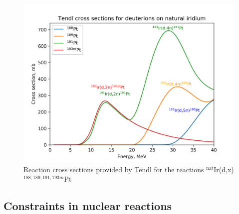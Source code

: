 \begin{figure}
    \centering
    \includegraphics{Theory/reactionchannels_pt.png}
    \caption{Reaction cross sections provided by Tendl for the reactions $^\text{nat}$Ir(d,x)$^{188,189,191,193m}$Pt}
    \label{fig:pt_reactionchannels}
\end{figure}

\subsection{Constraints in nuclear reactions}


